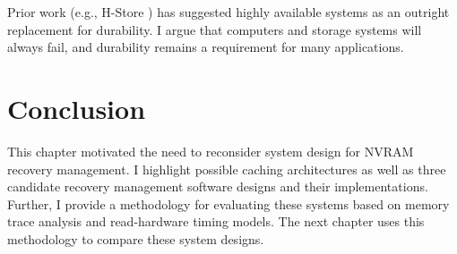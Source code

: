 Prior work (e.g., H-Store \cite{StonebrakerMadden07}) has suggested highly available systems as an outright replacement for durability.
I argue that computers and storage systems will always fail, and durability remains a requirement for many applications.

\section{Conclusion}
\label{sec:OLTP_design:Conclusion}
This chapter motivated the need to reconsider system design for NVRAM recovery management.
I highlight possible caching architectures as well as three candidate recovery management software designs and their implementations.
Further, I provide a methodology for evaluating these systems based on memory trace analysis and read-hardware timing models.
The next chapter uses this methodology to compare these system designs.
